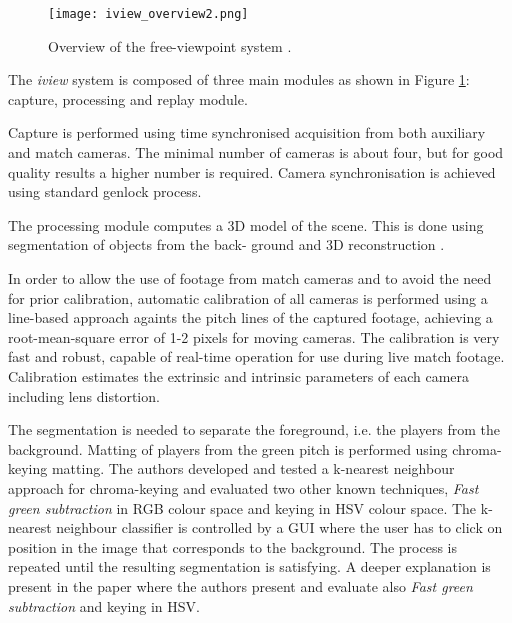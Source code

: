 
\begin{figure}[htbp]
\centerline{\texttt{[image: iview\_overview2.png]}}
\caption{Overview of the free-viewpoint system \cite{02_iview}.}
\label{fig:iview_overview}
\end{figure}


The \textit{iview} system is composed of three main modules as shown in Figure \ref{fig:iview_overview}: 
capture, processing and replay module.

Capture is performed using time synchronised acquisition from both auxiliary and
match cameras.
The minimal number of cameras is about four, but for good quality results a higher number is required.
Camera synchronisation is achieved using standard genlock process.

The processing module computes a 3D model of the scene.
This is done using segmentation of objects from the back-
ground and 3D reconstruction \cite{2.1_iview}.

In order to allow the use of footage from match cameras and to avoid the need for prior calibration, 
automatic calibration of all cameras is performed using a line-based approach againts the pitch lines of the captured footage, 
achieving a root-mean-square error of 1-2 pixels for moving cameras. 
The calibration is very fast and robust, capable of real-time operation for use during live match footage. 
Calibration estimates the extrinsic and intrinsic parameters of each camera including lens distortion.

The segmentation is needed to separate the foreground, i.e. the players from the background.
Matting of players from the green pitch is performed using chroma-keying matting. 
The authors developed and tested a k-nearest neighbour approach for chroma-keying and evaluated two other known techniques,
\textit{Fast green subtraction} in RGB colour space and keying in HSV colour space.
The k-nearest neighbour classifier is controlled by a GUI where the user has to click on position in the image that corresponds
to the background. 
The process is repeated until the resulting segmentation is satisfying.
A deeper explanation is present in the paper \cite{2.1_iview} where the authors present and evaluate also 
\textit{Fast green subtraction} and keying in HSV.

